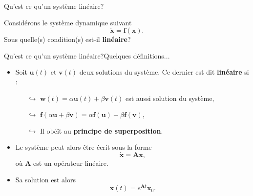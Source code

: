 \documentclass[usenames,dvipsnames,svgnames,10pt,aspectratio=169]{beamer}
\begin{document}
\begin{frame}[t, c]{Qu'est ce qu'un système linéaire?}{}
	\begin{block}{}
		\centering
		Considérons le système dynamique suivant
		$$ \dot{\bm x} = {\bm f}({\bm x}).$$
		Sous quelle(s) condition(s) est-il \alert{\textbf{linéaire}}?
	\end{block}

	\vspace{1cm}
\end{frame}

\begin{frame}[t, c]{Qu'est ce qu'un système linéaire?}{Quelques définitions...}

	\begin{itemize}
		\item 	Soit ${\bm u}(t)$ et ${\bm v}(t)$ deux solutions du système. Ce dernier est dit \alert{\textbf{linéaire}} si :
			\medskip
			\begin{itemize}
				\item[$\hookrightarrow$] ${\bm w}(t) = \alpha {\bm u}(t) + \beta {\bm v}(t)$ est aussi solution du système,
				\medskip
				\item[$\hookrightarrow$] ${\bm f}(\alpha {\bm u} + \beta {\bm v}) = \alpha {\bm f}({\bm u})  + \beta {\bm f}({\bm v})$,
				\medskip
				\item[$\hookrightarrow$] Il obéît au \alert{\textbf{principe de superposition}}.
			\end{itemize}

		\medskip

		\item Le système peut alors être écrit sous la forme
			$$ \dot{\bm x} = {\bm A}{\bm x},$$
			où ${\bm A}$ est un opérateur linéaire.

		\medskip

		\item Sa solution est alors
		$${\bm x}(t) = e^{{\bm A}t} {\bm x}_0.$$
	\end{itemize}

	\vspace{1cm}
\end{frame}
\end{document}
